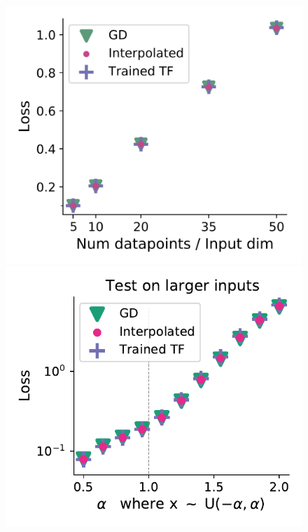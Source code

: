 \documentclass{article}
\theoremstyle{plain}
\theoremstyle{definition}
\theoremstyle{remark}
\begin{document}
\begin{figure}
\begin{minipage}{.28\textwidth}
\begin{center}
  \end{center}
  \vspace{-10pt}
\end{minipage}
\begin{minipage}{.23\textwidth}
  \centering
  \begin{center}
    \includegraphics[width=1.\textwidth]{Final_figures/linear/interroc.png}
  \end{center}
  \vspace{-10pt}
\end{minipage}
\begin{minipage}{.23\textwidth}
  \centering
  \begin{center}
    \includegraphics[width=1.\textwidth]{Final_figures/linear/linear_one_layer_one_head_0_002/normal.pdf}

\end{center}
\end{minipage}
\end{figure}
\end{document}

